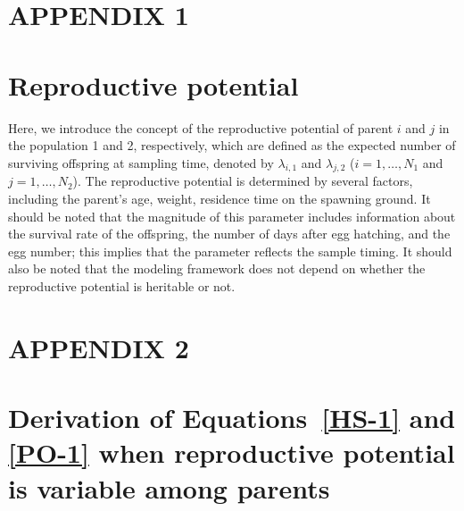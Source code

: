 \documentclass[12pt, English]{article}
\begin{document}
\begin{spacing}{1.9}
\clearpage

\section*{APPENDIX 1}
\setcounter{equation}{0}
\renewcommand{\theequation}{A\arabic{equation}}

\section*{Reproductive potential}

\renewcommand{\theequation}{A\arabic{equation}}
Here, we introduce the concept of the reproductive potential of parent $i$ and $j$ in the population 1 and 2, respectively, which are defined as the expected number of surviving offspring at sampling time, denoted by $\lambda_{i,1}$ and $\lambda_{j,2}$ ($i=1, \ldots, N_1$ and $j=1, \ldots, N_2$). The reproductive potential is determined by several factors, including the parent's age, weight, residence time on the spawning ground. It should be noted that the magnitude of this parameter includes information about the survival rate of the offspring, the number of days after egg hatching, and the egg number; this implies that the parameter reflects the sample timing. It should also be noted that the modeling framework does not depend on whether the reproductive potential is heritable or not.

\section*{APPENDIX 2}
\section*{Derivation of Equations~\ref{HS-1} and \ref{PO-1} when reproductive potential is variable among parents}


\end{spacing}
\end{document}
